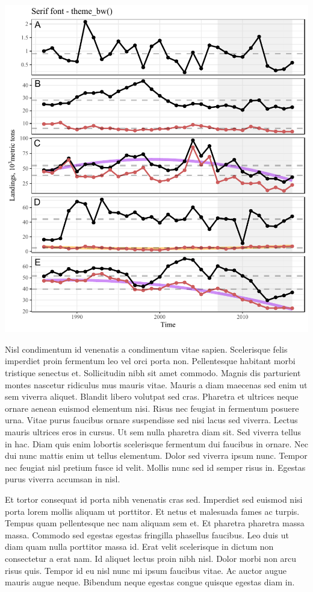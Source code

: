 \documentclass[11pt,]{article}
\begin{document}
\includegraphics{font_test_files/figure-latex/unnamed-chunk-3-1.pdf}

Nisl condimentum id venenatis a condimentum vitae sapien. Scelerisque
felis imperdiet proin fermentum leo vel orci porta non. Pellentesque
habitant morbi tristique senectus et. Sollicitudin nibh sit amet
commodo. Magnis dis parturient montes nascetur ridiculus mus mauris
vitae. Mauris a diam maecenas sed enim ut sem viverra aliquet. Blandit
libero volutpat sed cras. Pharetra et ultrices neque ornare aenean
euismod elementum nisi. Risus nec feugiat in fermentum posuere urna.
Vitae purus faucibus ornare suspendisse sed nisi lacus sed viverra.
Lectus mauris ultrices eros in cursus. Ut sem nulla pharetra diam sit.
Sed viverra tellus in hac. Diam quis enim lobortis scelerisque fermentum
dui faucibus in ornare. Nec dui nunc mattis enim ut tellus elementum.
Dolor sed viverra ipsum nunc. Tempor nec feugiat nisl pretium fusce id
velit. Mollis nunc sed id semper risus in. Egestas purus viverra
accumsan in nisl.

Et tortor consequat id porta nibh venenatis cras sed. Imperdiet sed
euismod nisi porta lorem mollis aliquam ut porttitor. Et netus et
malesuada fames ac turpis. Tempus quam pellentesque nec nam aliquam sem
et. Et pharetra pharetra massa massa. Commodo sed egestas egestas
fringilla phasellus faucibus. Leo duis ut diam quam nulla porttitor
massa id. Erat velit scelerisque in dictum non consectetur a erat nam.
Id aliquet lectus proin nibh nisl. Dolor morbi non arcu risus quis.
Tempor id eu nisl nunc mi ipsum faucibus vitae. Ac auctor augue mauris
augue neque. Bibendum neque egestas congue quisque egestas diam in.
\end{document}
